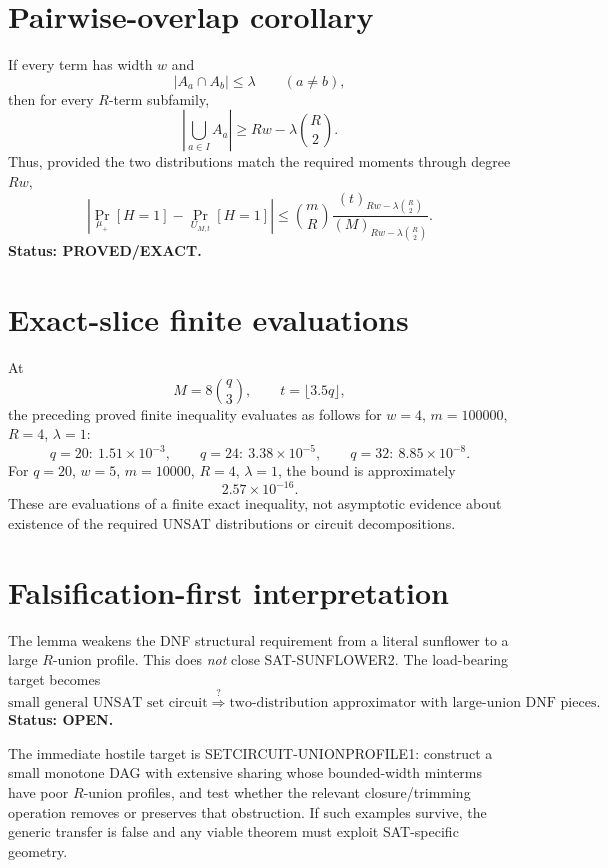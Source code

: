 \documentclass[11pt]{article}
\begin{document}
\section*{Pairwise-overlap corollary}
If every term has width $w$ and
\[
|A_a\cap A_b|\leq\lambda\qquad(a\neq b),
\]
then for every $R$-term subfamily,
\[
\left|\bigcup_{a\in I}A_a\right|
\geq Rw-\lambda\binom R2.
\]
Thus, provided the two distributions match the required moments through degree $Rw$,
\[
\boxed{
\left|\Pr_{\mu_+}[H=1]-\Pr_{U_{M,t}}[H=1]\right|
\leq
\binom mR
\frac{(t)_{Rw-\lambda\binom R2}}
     {(M)_{Rw-\lambda\binom R2}}
}.
\]
\textbf{Status: PROVED/EXACT.}

\section*{Exact-slice finite evaluations}
At
\[
M=8\binom q3,\qquad t=\lfloor3.5q\rfloor,
\]
the preceding proved finite inequality evaluates as follows for $w=4$, $m=100000$, $R=4$, $\lambda=1$:
\[
q=20:\ 1.51\times10^{-3},\qquad
q=24:\ 3.38\times10^{-5},\qquad
q=32:\ 8.85\times10^{-8}.
\]
For $q=20$, $w=5$, $m=10000$, $R=4$, $\lambda=1$, the bound is approximately
\[
2.57\times10^{-16}.
\]
These are evaluations of a finite exact inequality, not asymptotic evidence about existence of the required UNSAT distributions or circuit decompositions.

\section*{Falsification-first interpretation}
The lemma weakens the DNF structural requirement from a literal sunflower to a large $R$-union profile. This does \emph{not} close SAT-SUNFLOWER2. The load-bearing target becomes
\[
\boxed{
\text{small general UNSAT set circuit}
\stackrel{?}{\Longrightarrow}
\text{two-distribution approximator with large-union DNF pieces}.
}
\]
\textbf{Status: OPEN.}

The immediate hostile target is SETCIRCUIT-UNIONPROFILE1: construct a small monotone DAG with extensive sharing whose bounded-width minterms have poor $R$-union profiles, and test whether the relevant closure/trimming operation removes or preserves that obstruction. If such examples survive, the generic transfer is false and any viable theorem must exploit SAT-specific geometry.
\end{document}
